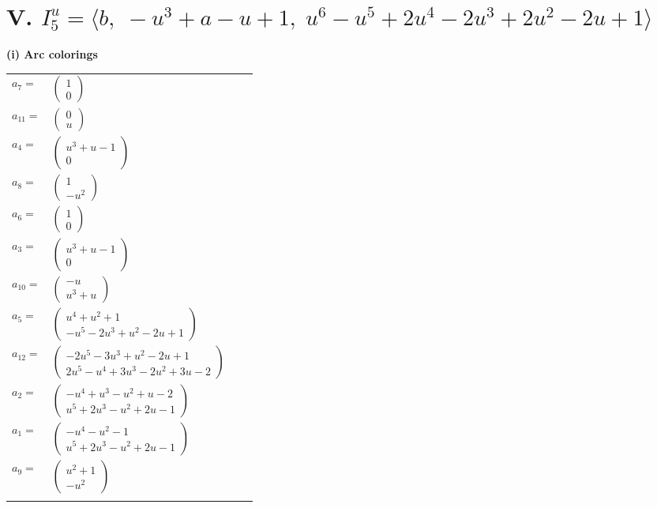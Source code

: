 \documentclass[1p]{elsarticle_modified}
\theoremstyle{definition}
\begin{document}
\centering \section*{V. $I^u_{5}= \langle b,\;- u^3+a- u+1,\;u^6- u^5+2 u^4-2 u^3+2 u^2-2 u+1 \rangle$}
\flushleft \textbf{(i) Arc colorings}\\
\begin{tabular}{m{7pt} m{180pt} m{7pt} m{180pt} }
\flushright $a_{7}=$&$\begin{pmatrix}1\\0\end{pmatrix}$ \\
\flushright $a_{11}=$&$\begin{pmatrix}0\\u\end{pmatrix}$ \\
\flushright $a_{4}=$&$\begin{pmatrix}u^3+u-1\\0\end{pmatrix}$ \\
\flushright $a_{8}=$&$\begin{pmatrix}1\\- u^2\end{pmatrix}$ \\
\flushright $a_{6}=$&$\begin{pmatrix}1\\0\end{pmatrix}$ \\
\flushright $a_{3}=$&$\begin{pmatrix}u^3+u-1\\0\end{pmatrix}$ \\
\flushright $a_{10}=$&$\begin{pmatrix}- u\\u^3+u\end{pmatrix}$ \\
\flushright $a_{5}=$&$\begin{pmatrix}u^4+u^2+1\\- u^5-2 u^3+u^2-2 u+1\end{pmatrix}$ \\
\flushright $a_{12}=$&$\begin{pmatrix}-2 u^5-3 u^3+u^2-2 u+1\\2 u^5- u^4+3 u^3-2 u^2+3 u-2\end{pmatrix}$ \\
\flushright $a_{2}=$&$\begin{pmatrix}- u^4+u^3- u^2+u-2\\u^5+2 u^3- u^2+2 u-1\end{pmatrix}$ \\
\flushright $a_{1}=$&$\begin{pmatrix}- u^4- u^2-1\\u^5+2 u^3- u^2+2 u-1\end{pmatrix}$ \\
\flushright $a_{9}=$&$\begin{pmatrix}u^2+1\\- u^2\end{pmatrix}$\\&\end{tabular}
\end{document}
